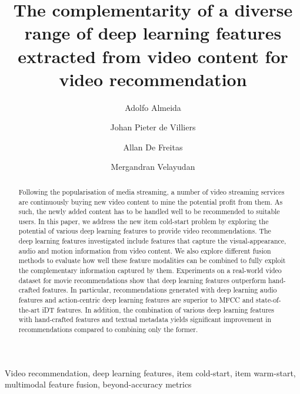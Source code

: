 \documentclass[review]{elsarticle}
\begin{document}
 \begin{frontmatter}

















\title{The complementarity of a diverse range of deep learning features extracted from video content for video recommendation}


\author[university]{Adolfo Almeida }

\author[university]{Johan Pieter de Villiers}

\author[university]{Allan De Freitas}

\author[multichoice]{Mergandran Velayudan}


\address[university]{Department of Electrical, Electronic and Computer Engineering, University of Pretoria, Private Bag X20, Hatfield 0028, South Africa}
\address[multichoice]{AI Centre of Excellence, MultiChoice Group, PO Box 1502, Randburg 2125, South Africa}



  
\begin{abstract}
Following the popularisation of media streaming, a number of video streaming services are continuously buying new video content to mine the potential profit from them. As such, the newly added content has to be handled well to be recommended to suitable users. In this paper, we address the new item cold-start problem by exploring the potential of various deep learning features to provide video recommendations. The deep learning features investigated include features that capture the visual-appearance, audio and motion information from video content. We also explore different fusion methods to evaluate how well these feature modalities can be combined to fully exploit the complementary information captured by them. Experiments on a real-world video dataset for movie recommendations show that deep learning features outperform hand-crafted features. In particular, recommendations generated with deep learning audio features and action-centric deep learning features are superior to MFCC and state-of-the-art iDT features. In addition, the combination of various deep learning features with hand-crafted features and textual metadata yields significant improvement in recommendations compared to combining only the former.             
\end{abstract}


\begin{keyword}
Video recommendation, deep learning features, item cold-start, item warm-start, multimodal feature fusion, beyond-accuracy metrics\end{keyword}

\end{frontmatter}
\end{document}
